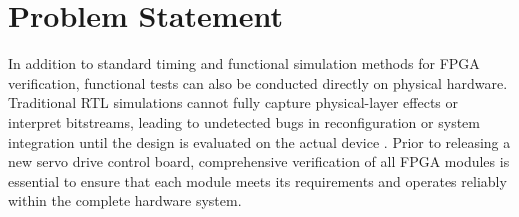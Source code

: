 %
%
%		
%		
%		
%		
%

\section{Problem Statement}
\label{sec:intro:ProblemStatement}

In addition to standard timing and functional simulation methods for \acs{FPGA} verification, functional tests can also be conducted directly on physical hardware. Traditional RTL simulations cannot fully capture physical-layer effects or interpret bitstreams, leading to undetected bugs in reconfiguration or system integration until the design is evaluated on the actual device \cite{Gong2013}. Prior to releasing a new servo drive control board, comprehensive verification of all \acs{FPGA} modules is essential to ensure that each module meets its requirements and operates reliably within the complete hardware system.

